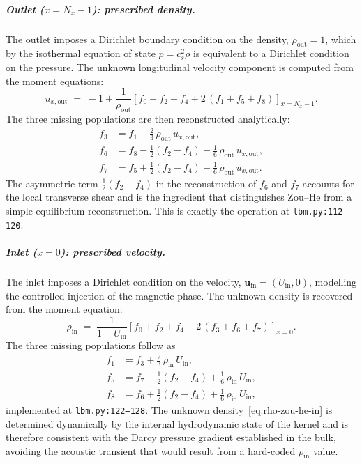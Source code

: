 \subparagraph{Outlet ($x = N_x - 1$): prescribed density.}
The outlet imposes a Dirichlet boundary condition on the density, $\rho_{\mathrm{out}} = 1$, which by the isothermal equation of state $p = c_s^{2}\rho$ is equivalent to a Dirichlet condition on the pressure.
The unknown longitudinal velocity component is computed from the moment equations:
\begin{equation}
u_{x,\mathrm{out}}
\;=\; -1 + \frac{1}{\rho_{\mathrm{out}}}\!\left[
f_0 + f_2 + f_4 + 2\,(f_1 + f_5 + f_8)\right]_{x=N_x-1}.
\label{eq:ux-zou-he-out}
\end{equation}
The three missing populations are then reconstructed analytically:
\begin{equation}
\begin{aligned}
f_3 &= f_1 - \tfrac{2}{3}\,\rho_{\mathrm{out}}\,u_{x,\mathrm{out}}, \\
f_6 &= f_8 - \tfrac{1}{2}(f_2 - f_4) - \tfrac{1}{6}\,\rho_{\mathrm{out}}\,u_{x,\mathrm{out}}, \\
f_7 &= f_5 + \tfrac{1}{2}(f_2 - f_4) - \tfrac{1}{6}\,\rho_{\mathrm{out}}\,u_{x,\mathrm{out}}.
\end{aligned}
\label{eq:zou-he-out-pops}
\end{equation}
The asymmetric term $\tfrac{1}{2}(f_2 - f_4)$ in the reconstruction of $f_6$ and $f_7$ accounts for the local transverse shear and is the ingredient that distinguishes Zou--He from a simple equilibrium reconstruction.
This is exactly the operation at \texttt{lbm.py:112--120}.

\subparagraph{Inlet ($x = 0$): prescribed velocity.}
The inlet imposes a Dirichlet condition on the velocity, $\bm{u}_{\mathrm{in}} = (U_{\mathrm{in}}, 0)$, modelling the controlled injection of the magnetic phase.
The unknown density is recovered from the moment equation:
\begin{equation}
\rho_{\mathrm{in}}
\;=\; \frac{1}{1 - U_{\mathrm{in}}}\!\left[
f_0 + f_2 + f_4 + 2\,(f_3 + f_6 + f_7)\right]_{x=0}.
\label{eq:rho-zou-he-in}
\end{equation}
The three missing populations follow as
\begin{equation}
\begin{aligned}
f_1 &= f_3 + \tfrac{2}{3}\,\rho_{\mathrm{in}}\,U_{\mathrm{in}}, \\
f_5 &= f_7 - \tfrac{1}{2}(f_2 - f_4) + \tfrac{1}{6}\,\rho_{\mathrm{in}}\,U_{\mathrm{in}}, \\
f_8 &= f_6 + \tfrac{1}{2}(f_2 - f_4) + \tfrac{1}{6}\,\rho_{\mathrm{in}}\,U_{\mathrm{in}},
\end{aligned}
\label{eq:zou-he-in-pops}
\end{equation}
implemented at \texttt{lbm.py:122--128}.
The unknown density~\eqref{eq:rho-zou-he-in} is determined dynamically by the internal hydrodynamic state of the kernel and is therefore consistent with the Darcy pressure gradient established in the bulk, avoiding the acoustic transient that would result from a hard-coded $\rho_{\mathrm{in}}$ value.

